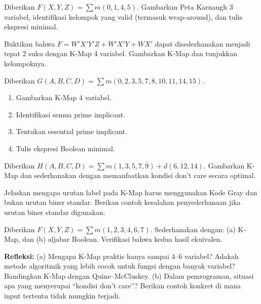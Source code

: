 \documentclass[../main]{subfiles}
\begin{document}

\begin{latihan}
  \item Diberikan $F(X,Y,Z) = \sum m(0, 1, 4, 5)$. Gambarkan Peta Karnaugh 3 variabel, identifikasi kelompok yang valid (termasuk wrap-around), dan tulis ekspresi minimal.
  \item Buktikan bahwa $F = W'X'Y'Z + W'X'Y + WX'$ dapat disederhanakan menjadi tepat 2 suku dengan K-Map 4 variabel. Gambarkan K-Map dan tunjukkan kelompoknya.
  \item Diberikan $G(A,B,C,D) = \sum m(0, 2, 3, 5, 7, 8, 10, 11, 14, 15)$.
  \begin{enumerate}
    \item Gambarkan K-Map 4 variabel.
    \item Identifikasi semua prime implicant.
    \item Tentukan essential prime implicant.
    \item Tulis ekspresi Boolean minimal.
  \end{enumerate}
  \item Diberikan $H(A,B,C,D) = \sum m(1, 3, 5, 7, 9) + d(6, 12, 14)$. Gambarkan K-Map dan sederhanakan dengan memanfaatkan kondisi don't care secara optimal.
  \item Jelaskan mengapa urutan label pada K-Map harus menggunakan Kode Gray dan bukan urutan biner standar. Berikan contoh kesalahan penyederhanaan jika urutan biner standar digunakan.
  \item Diberikan $F(X,Y,Z) = \sum m(1, 2, 3, 4, 6, 7)$. Sederhanakan dengan: (a) K-Map, dan (b) aljabar Boolean. Verifikasi bahwa kedua hasil ekuivalen.
  \item \textbf{Refleksi:} (a) Mengapa K-Map praktis hanya sampai 4--6 variabel? Adakah metode algoritmik yang lebih cocok untuk fungsi dengan banyak variabel? Bandingkan K-Map dengan Quine--McCluskey. (b) Dalam pemrograman, situasi apa yang menyerupai ``kondisi don't care''? Berikan contoh konkret di mana input tertentu tidak mungkin terjadi.
\end{latihan}

\end{document}
